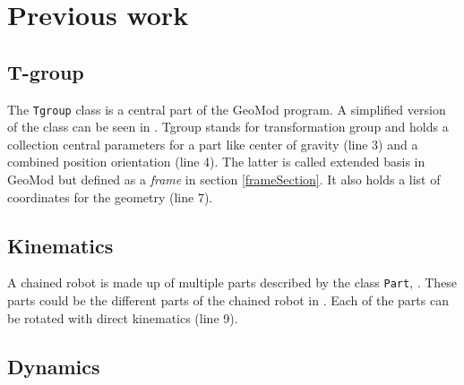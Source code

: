 \chapter{Previous work}\label{previous_work}


\section{T-group}



The \texttt{Tgroup} class is a central part of the GeoMod program. A simplified version of the class can be seen in . Tgroup stands for transformation group and holds a collection central parameters for a part like center of gravity (line 3) and a combined position orientation (line 4). The latter is called extended basis in GeoMod but defined as a \textit{frame} in section \ref{frameSection}. It also holds a list of coordinates for the geometry (line 7).

\label{Tgroup}


\section{Kinematics}


A chained robot is made up of multiple parts described by the class \texttt{Part}, . These parts could be the different parts of the chained robot in . Each of the parts can be rotated with direct kinematics (line 9).


\label{Part}


\section{Dynamics}
